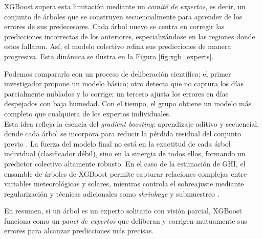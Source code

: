 XGBoost supera esta limitación mediante un \textit{comité de expertos}, es decir, un conjunto de árboles que se construyen secuencialmente para aprender de los errores de sus predecesores. Cada árbol nuevo se centra en corregir las predicciones incorrectas de los anteriores, especializándose en las regiones donde estos fallaron. Así, el modelo colectivo refina sus predicciones de manera progresiva. Esta dinámica se ilustra en la Figura \ref{fig:xgb_experts}.

Podemos compararlo con un proceso de deliberación científica: el primer investigador propone un modelo básico; otro detecta que no captura los días parcialmente nublados y lo corrige; un tercero ajusta los errores en días despejados con baja humedad. Con el tiempo, el grupo obtiene un modelo más completo que cualquiera de los expertos individuales.\\

Esta idea refleja la esencia del \textit{gradient boosting}: aprendizaje aditivo y secuencial, donde cada árbol se incorpora para reducir la pérdida residual del conjunto previo \cite{chen2016xgboost}. La fuerza del modelo final no está en la exactitud de cada árbol individual (clasificador débil), sino en la sinergia de todos ellos, formando un predictor colectivo altamente robusto.
En el caso de la estimación de GHI, el ensamble de árboles de XGBoost permite capturar relaciones complejas entre variables meteorológicas y solares, mientras controla el sobreajuste mediante regularización y técnicas adicionales como \textit{shrinkage} y submuestreo \cite{xgboostdoc}.

En resumen, si un árbol es un experto solitario con visión parcial, XGBoost funciona como un \textit{panel de expertos} que deliberan y corrigen mutuamente sus errores para alcanzar predicciones más precisas.

